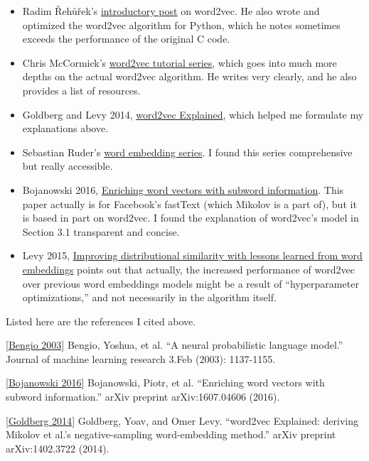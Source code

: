 \documentclass[11pt]{article}
\begin{document}
\begin{itemize}
\item
  Radim Řehůřek's
  \href{https://rare-technologies.com/deep-learning-with-word2vec-and-gensim/}{introductory
  post} on word2vec. He also wrote and optimized the word2vec algorithm
  for Python, which he notes sometimes exceeds the performance of the
  original C code.
\item
  Chris McCormick's
  \href{http://mccormickml.com/2016/04/19/word2vec-tutorial-the-skip-gram-model/}{word2vec
  tutorial series}, which goes into much more depths on the actual
  word2vec algorithm. He writes very clearly, and he also provides a
  list of resources.
\item
  Goldberg and Levy 2014,
  \href{https://arxiv.org/abs/1402.3722}{word2vec Explained}, which
  helped me formulate my explanations above.
\item
  Sebastian Ruder's
  \href{http://ruder.io/word-embeddings-1/index.html}{word embedding
  series}. I found this series comprehensive but really accessible.
\item
  Bojanowski 2016, \href{https://arxiv.org/pdf/1607.04606.pdf}{Enriching
  word vectors with subword information}. This paper actually is for
  Facebook's fastText (which Mikolov is a part of), but it is based in
  part on word2vec. I found the explanation of word2vec's model in
  Section 3.1 transparent and concise.
\item
  Levy 2015,
  \href{https://levyomer.files.wordpress.com/2015/03/improving-distributional-similarity-tacl-2015.pdf}{Improving
  distributional similarity with lessons learned from word embeddings}
  points out that actually, the increased performance of word2vec over
  previous word embeddings models might be a result of ``hyperparameter
  optimizations,'' and not necessarily in the algorithm itself.
\end{itemize}

Listed here are the references I cited above.

{[}\href{http://www.jmlr.org/papers/volume3/bengio03a/bengio03a.pdf}{Bengio
2003}{]} Bengio, Yoshua, et al. ``A neural probabilistic language
model.'' Journal of machine learning research 3.Feb (2003): 1137-1155.

{[}\href{https://arxiv.org/pdf/1607.04606.pdf}{Bojanowski 2016}{]}
Bojanowski, Piotr, et al. ``Enriching word vectors with subword
information.'' arXiv preprint arXiv:1607.04606 (2016).

{[}\href{https://arxiv.org/pdf/1402.3722.pdf}{Goldberg 2014}{]}
Goldberg, Yoav, and Omer Levy. ``word2vec Explained: deriving Mikolov et
al.'s negative-sampling word-embedding method.'' arXiv preprint
arXiv:1402.3722 (2014).
\end{document}
